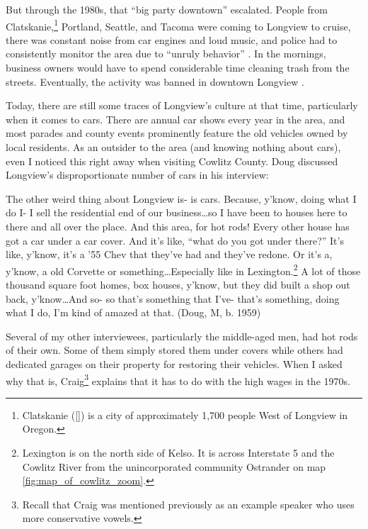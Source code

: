 But through the 1980s, that ``big party downtown'' escalated. People from Clatskanie,\footnote{Clatskanie ([]) is a city of approximately 1,700 people West of Longview in Oregon.} Portland, Seattle, and Tacoma were coming to Longview to cruise, there was constant noise from car engines and loud music, and police had to consistently monitor the area due to ``unruly behavior'' \citep[5]{longview_1991_minutes}. In the mornings, business owners would have to spend considerable time cleaning trash from the streets. Eventually, the activity was banned in downtown Longview \citep{longview_1991_municipal_code}.

Today, there are still some traces of Longview's culture at that time, particularly when it comes to cars. There are annual car shows every year in the area, and most parades and county events prominently feature the old vehicles owned by local residents. As an outsider to the area (and knowing nothing about cars), even I noticed this right away when visiting Cowlitz County. Doug discussed Longview's disproportionate number of cars in his interview:
\begin{num_quote}
    The other weird thing about Longview is- is cars. Because, y'know, doing what I do I- I sell the residential end of our business\ldots so I have been to houses here to there and all over the place. And this area, for hot rods! Every other house has got a car under a car cover. And it's like, ``what do you got under there?'' It's like, y'know, it's a '55 Chev that they've had and they've redone. Or it's a, y'know, a old Corvette or something\ldots Especially like in Lexington.\footnote{Lexington is on the north side of Kelso. It is across Interstate 5 and the Cowlitz River from the unincorporated community Ostrander on map \ref{fig:map_of_cowlitz_zoom}.}  A lot of those thousand square foot homes, box houses, y'know, but they did built a shop out back, y'know\ldots And so- so that's something that I've- that's something, doing what I do, I'm kind of amazed at that. (Doug, M, b. 1959)
    \label{quote:hot_rods}
\end{num_quote}
Several of my other interviewees, particularly the middle-aged men, had hot rods of their own. Some of them simply stored them under covers while others had dedicated garages on their property for restoring their vehicles. When I asked why that is, Craig\footnote{Recall that Craig was mentioned previously as an example speaker who uses more conservative vowels.} explains that it has to do with the high wages in the 1970s.
